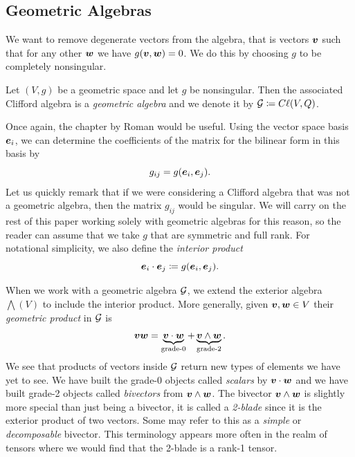 \documentclass{article}
\begin{document}
\subsection{Geometric Algebras}
We want to remove degenerate vectors from the algebra, that is vectors $\boldsymbol{v}$ such that for any other $\boldsymbol{w}$ we have $g(\boldsymbol{v},\boldsymbol{w})=0$. We do this by choosing $g$ to be completely nonsingular. 
\begin{definition}
Let $(V,g)$ be a geometric space and let $g$ be nonsingular. Then the associated Clifford algebra is a \emph{geometric algebra} and we denote it by $\mathcal{G} \coloneqq C\ell(V,Q)$.
\end{definition}
Once again, the chapter \cite{roman_metric_2008} by Roman would be useful. Using the vector space basis $\boldsymbol{e}_i$, we can determine the coefficients of the matrix for the bilinear form in this basis by
\begin{equation}
g_{ij}=g(\boldsymbol{e}_i,\boldsymbol{e}_j).
\end{equation}
Let us quickly remark that if we were considering a Clifford algebra that was not a geometric algebra, then the matrix $g_{ij}$ would be singular. We will carry on the rest of this paper working solely with geometric algebras for this reason, so the reader can assume that we take $g$ that are symmetric and full rank. For notational simplicity, we also define the \emph{interior product}
\begin{equation}
\label{eq:interior_product}
    \boldsymbol{e}_i \cdot \boldsymbol{e}_j \coloneqq g(\boldsymbol{e}_i,\boldsymbol{e}_j).
\end{equation}

When we work with a geometric algebra $\mathcal{G}$, we extend the exterior algebra $\bigwedge(V)$ to include the interior product. More generally, given  $\boldsymbol{v},\boldsymbol{w}\in V$ their \emph{geometric product} in $\mathcal{G}$ is
\begin{equation}
\label{eq:product_of_vectors}
    \boldsymbol{v}\boldsymbol{w}= \underbrace{\boldsymbol{v}\cdot \boldsymbol{w}}_{\textrm{grade-0}} +\underbrace{\boldsymbol{v}\wedge \boldsymbol{w}}_{\textrm{grade-2}}.
\end{equation}
We see that products of vectors inside $\mathcal{G}$ return new types of elements we have yet to see. We have built the grade-0 objects called \emph{scalars} by $\boldsymbol{v}\cdot \boldsymbol{w}$ and we have built grade-2 objects called \emph{bivectors} from $\boldsymbol{v}\wedge \boldsymbol{w}$. The bivector $\boldsymbol{v}\wedge \boldsymbol{w}$ is slightly more special than just being a bivector, it is called a \emph{2-blade} since it is the exterior product of two vectors. Some may refer to this as a \emph{simple} or \emph{decomposable} bivector. This terminology appears more often in the realm of tensors where we would find that the 2-blade is a rank-1 tensor.
\end{document}
